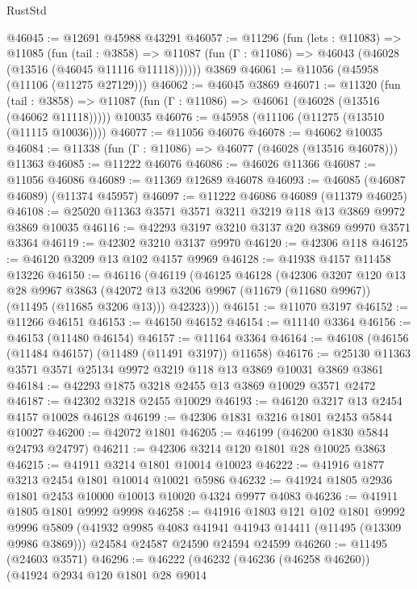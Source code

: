\begin{lexlean}{RustStd}
\begin{coremodule}
@46045 := @12691 @45988 @43291
@46057 := @11296
    (fun (lets : @11083) =>
    @11085
      (fun (tail : @3858) =>
      @11087 (fun (Γ : @11086) => @46043 (@46028 (@13516 (@46045 @11116 @11118))))))
    @3869
@46061 := @11056 (@45958 (@11106 (@11275 @27129)))
@46062 := @46045 @3869
@46071 := @11320
    (fun (tail : @3858) => @11087 (fun (Γ : @11086) => @46061 (@46028 (@13516 (@46062 @11118)))))
    @10035
@46076 := @45958 (@11106 (@11275 (@13510 (@11115 @10036))))
@46077 := @11056 @46076
@46078 := @46062 @10035
@46084 := @11338 (fun (Γ : @11086) => @46077 (@46028 (@13516 @46078))) @11363
@46085 := @11222 @46076
@46086 := @46026 @11366
@46087 := @11056 @46086
@46089 := @11369 @12689 @46078
@46093 := @46085 (@46087 @46089) (@11374 @45957)
@46097 := @11222 @46086 @46089 (@11379 @46025)
@46108 := @25020 @11363 @3571 @3571 @3211 @3219 @118 @13 @3869 @9972 @3869 @10035
@46116 := @42293 @3197 @3210 @3137 @20 @3869 @9970 @3571 @3364
@46119 := @42302 @3210 @3137 @9970
@46120 := @42306 @118
@46125 := @46120 @3209 @13 @102 @4157 @9969
@46128 := @41938 @4157 @11458 @13226
@46150 := @46116
    (@46119
      (@46125
        @46128
        (@42306
          @3207
          @120
          @13
          @28
          @9967
          @3863
          (@42072 @13 @3206 @9967 (@11679 (@11680 @9967)) (@11495 (@11685 @3206 @13)))
          @42323)))
@46151 := @11070 @3197
@46152 := @11266 @46151
@46153 := @46150 @46152
@46154 := @11140 @3364
@46156 := @46153 (@11480 @46154)
@46157 := @11164 @3364
@46164 := @46108 (@46156 (@11484 @46157) (@11489 (@11491 @3197)) @11658)
@46176 := @25130 @11363 @3571 @3571 @25134 @9972 @3219 @118 @13 @3869 @10031 @3869 @3861
@46184 := @42293 @1875 @3218 @2455 @13 @3869 @10029 @3571 @2472
@46187 := @42302 @3218 @2455 @10029
@46193 := @46120 @3217 @13 @2454 @4157 @10028 @46128
@46199 := @42306 @1831 @3216 @1801 @2453 @5844 @10027
@46200 := @42072 @1801
@46205 := @46199 (@46200 @1830 @5844 @24793 @24797)
@46211 := @42306 @3214 @120 @1801 @28 @10025 @3863
@46215 := @41911 @3214 @1801 @10014 @10023
@46222 := @41916 @1877 @3213 @2454 @1801 @10014 @10021 @5986
@46232 := @41924 @1805 @2936 @1801 @2453 @10000 @10013 @10020 @4324 @9977 @4083
@46236 := @41911 @1805 @1801 @9992 @9998
@46258 := @41916
    @1803
    @121
    @102
    @1801
    @9992
    @9996
    @5809
    (@41932 @9985 @4083 @41941 @41943 @14411 (@11495 (@13309 @9986 @3869)))
    @24584
    @24587
    @24590
    @24594
    @24599
@46260 := @11495 (@24603 @3571)
@46296 := @46222
    (@46232
      (@46236 (@46258 @46260))
      (@41924
        @2934
        @120
        @1801
        @28
        @9014

\end{coremodule}
\end{lexlean}
